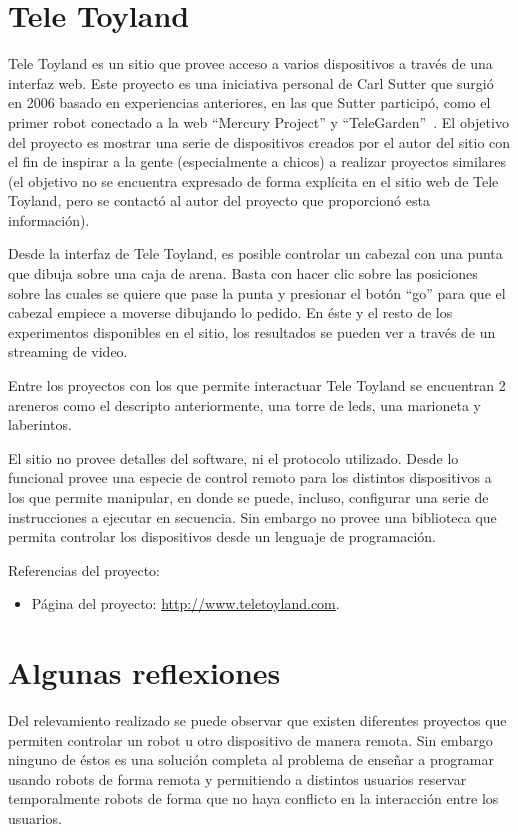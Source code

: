 \section{Tele Toyland}

Tele Toyland es un sitio que provee acceso a varios dispositivos a través
de una interfaz web. Este proyecto es una iniciativa personal de Carl
Sutter que surgió en 2006 basado en experiencias anteriores, en las que
Sutter participó, como
el primer robot conectado a la web
``Mercury Project''
y ``TeleGarden''~\citep{golberg_2010}.
El objetivo del proyecto es mostrar una serie de dispositivos
creados por el autor del sitio con el fin de inspirar a la gente (especialmente
a chicos) a realizar proyectos similares (el objetivo no se encuentra
expresado de forma explícita en el sitio web  de Tele Toyland, pero se contactó
al autor del proyecto que proporcionó esta información).


Desde la interfaz de Tele Toyland, es posible controlar un cabezal con una
punta que dibuja sobre
una caja de arena. Basta con hacer clic sobre las posiciones sobre las cuales
se quiere que pase la punta y presionar el botón ``go'' para que el cabezal
empiece a moverse dibujando lo pedido. En éste y el resto de los experimentos
disponibles en el sitio, los resultados se pueden ver a través de un streaming
de video.


Entre los proyectos con los que permite interactuar Tele Toyland
se encuentran  2 areneros como el descripto
anteriormente, una torre de leds, una marioneta y laberintos.

El sitio no provee detalles del software, ni el protocolo utilizado. Desde
lo funcional
provee una especie de control remoto para los distintos dispositivos a los
que permite
manipular, en donde se puede, incluso, configurar una serie de instrucciones a ejecutar
en secuencia. Sin embargo no provee una biblioteca que permita controlar
los dispositivos desde un lenguaje de programación.

Referencias del proyecto:
\begin{itemize}
    \item Página del proyecto: \url{http://www.teletoyland.com}.
\end{itemize}


\section{Algunas reflexiones}

Del relevamiento realizado se puede observar que existen diferentes
proyectos que permiten controlar un robot u otro dispositivo de
manera remota. Sin embargo ninguno de éstos es una solución completa
al problema de
enseñar a programar usando robots de forma remota y permitiendo a distintos
usuarios reservar temporalmente robots de forma que no haya conflicto en la
interacción entre los usuarios.

